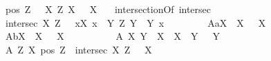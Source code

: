 \begin{isabellebody}
\ \ {\isachardoublequoteopen}pos\ Z\ {\isasymequiv}\ \ \isactrlbold {\isasymforall}X{\isachardot}\ Z\ X\ \isactrlbold {\isasymrightarrow}\ {\isasymP}\ X{\isachardoublequoteclose}\ \ \isanewline
{}\isamarkupfalse%
\ intersectionOf{\isacharcolon}{\isacharcolon}{\isachardoublequoteopen}{\isasymup}{\isasymlangle}{\isasymup}{\isasymlangle}{\isasymzero}{\isasymrangle}{\isacharcomma}{\isasymup}{\isasymlangle}{\isasymup}{\isasymlangle}{\isasymzero}{\isasymrangle}{\isasymrangle}{\isasymrangle}{\isachardoublequoteclose}\ {\isacharparenleft}{\isachardoublequoteopen}intersec{\isachardoublequoteclose}{\isacharparenright}\ \isanewline
\ \ {\isachardoublequoteopen}intersec\ X\ Z\ {\isasymequiv}\ \ \isactrlbold {\isasymbox}{\isacharparenleft}\isactrlbold {\isasymforall}x{\isachardot}{\isacharparenleft}X\ x\ \isactrlbold {\isasymleftrightarrow}\ {\isacharparenleft}\isactrlbold {\isasymforall}Y{\isachardot}\ {\isacharparenleft}Z\ Y{\isacharparenright}\ \isactrlbold {\isasymrightarrow}\ {\isacharparenleft}Y\ x{\isacharparenright}{\isacharparenright}{\isacharparenright}{\isacharparenright}{\isachardoublequoteclose}\ \ \isanewline
\ \ \isanewline
{}\isamarkupfalse%
\ \isanewline
\ \ A{}a{\isacharcolon}{\isachardoublequoteopen}{\isasymlfloor}\isactrlbold {\isasymforall}X{\isachardot}\ {\isasymP}\ {\isacharparenleft}\isactrlbold {\isasymrightharpoondown}X{\isacharparenright}\ \isactrlbold {\isasymrightarrow}\ \isactrlbold {\isasymnot}{\isacharparenleft}{\isasymP}\ X{\isacharparenright}\ {\isasymrfloor}{\isachardoublequoteclose}\ \ \ \ \ \ \ %
\isanewline
\ \ A{}b{\isacharcolon}{\isachardoublequoteopen}{\isasymlfloor}\isactrlbold {\isasymforall}X{\isachardot}\ \isactrlbold {\isasymnot}{\isacharparenleft}{\isasymP}\ X{\isacharparenright}\ \isactrlbold {\isasymrightarrow}\ {\isasymP}\ {\isacharparenleft}\isactrlbold {\isasymrightharpoondown}X{\isacharparenright}{\isasymrfloor}{\isachardoublequoteclose}\ \ \ \ \ \ \ \ %
\isanewline
\ \ A{}{\isacharcolon}\ {\isachardoublequoteopen}{\isasymlfloor}\isactrlbold {\isasymforall}X\ Y{\isachardot}\ {\isacharparenleft}{\isasymP}\ X\ \isactrlbold {\isasymand}\ {\isacharparenleft}X\ {\isasymRrightarrow}\ Y{\isacharparenright}{\isacharparenright}\ \isactrlbold {\isasymrightarrow}\ {\isasymP}\ Y{\isasymrfloor}{\isachardoublequoteclose}\ \ \ \ %
\isanewline
\ \ A{}{\isacharcolon}\ {\isachardoublequoteopen}{\isasymlfloor}\isactrlbold {\isasymforall}Z\ X{\isachardot}\ {\isacharparenleft}pos\ Z\ \isactrlbold {\isasymand}\ intersec\ X\ Z{\isacharparenright}\ \isactrlbold {\isasymrightarrow}\ {\isasymP}\ X{\isasymrfloor}{\isachardoublequoteclose}\ %

\end{isabellebody}
